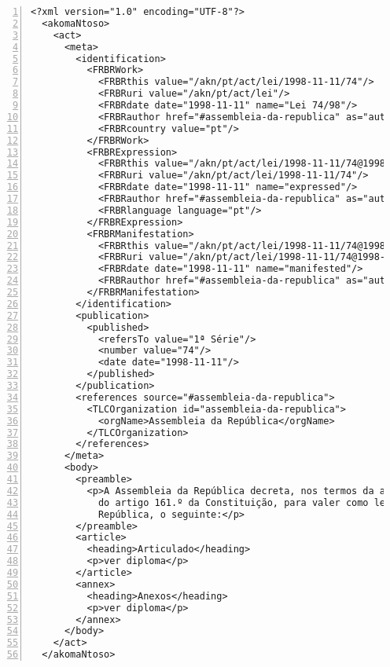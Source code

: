 \begin{Verbatim}[frame=single, numbers=left, fontsize=\footnotesize, commandchars=\\\{\}]
<?xml version="1.0" encoding="UTF-8"?>
  <akomaNtoso>
    <act>
      <meta>
        <identification>
          <FRBRWork>
            <FRBRthis value="/akn/pt/act/lei/1998-11-11/74"/>
            <FRBRuri value="/akn/pt/act/lei"/>
            <FRBRdate date="1998-11-11" name="Lei 74/98"/>
            <FRBRauthor href="#assembleia-da-republica" as="author"/>
            <FRBRcountry value="pt"/>
          </FRBRWork>
          <FRBRExpression>
            <FRBRthis value="/akn/pt/act/lei/1998-11-11/74@1998-11-11"/>
            <FRBRuri value="/akn/pt/act/lei/1998-11-11/74"/>
            <FRBRdate date="1998-11-11" name="expressed"/>
            <FRBRauthor href="#assembleia-da-republica" as="author"/>
            <FRBRlanguage language="pt"/>
          </FRBRExpression>
          <FRBRManifestation>
            <FRBRthis value="/akn/pt/act/lei/1998-11-11/74@1998-11-11"/>
            <FRBRuri value="/akn/pt/act/lei/1998-11-11/74@1998-11-11"/>
            <FRBRdate date="1998-11-11" name="manifested"/>
            <FRBRauthor href="#assembleia-da-republica" as="author"/>
          </FRBRManifestation>
        </identification>
        <publication>
          <published>
            <refersTo value="1ª Série"/>
            <number value="74"/>
            <date date="1998-11-11"/>
          </published>
        </publication>
        <references source="#assembleia-da-republica">
          <TLCOrganization id="assembleia-da-republica">
            <orgName>Assembleia da República</orgName>
          </TLCOrganization>
        </references>
      </meta>
      <body>
        <preamble>
          <p>A Assembleia da República decreta, nos termos da alínea c) 
            do artigo 161.º da Constituição, para valer como lei geral da 
            República, o seguinte:</p>
        </preamble>
        <article>
          <heading>Articulado</heading>
          <p>ver diploma</p>
        </article>
        <annex>
          <heading>Anexos</heading>
          <p>ver diploma</p>
        </annex>
      </body>
    </act>
  </akomaNtoso>        
\end{Verbatim}

